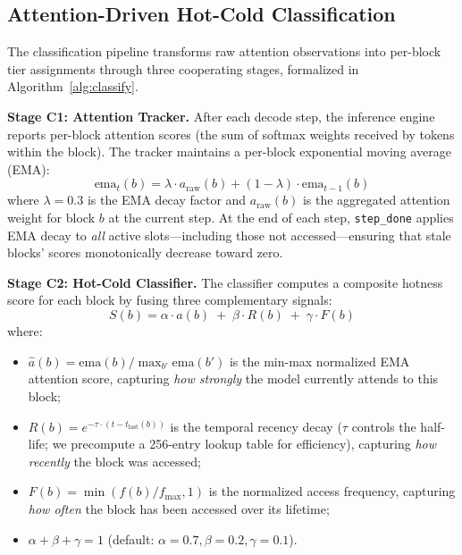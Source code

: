 \documentclass[conference]{IEEEtran}
\begin{document}

\subsection{Attention-Driven Hot-Cold Classification}
\label{sec:classification}

The classification pipeline transforms raw attention observations into per-block tier assignments through three cooperating stages, formalized in Algorithm~\ref{alg:classify}.

\textbf{Stage C1: Attention Tracker.} After each decode step, the inference engine reports per-block attention scores (the sum of softmax weights received by tokens within the block). The tracker maintains a per-block exponential moving average (EMA):
\begin{equation}
\text{ema}_{t}(b) = \lambda \cdot a_{\text{raw}}(b) + (1 - \lambda) \cdot \text{ema}_{t-1}(b)
\end{equation}
where $\lambda = 0.3$ is the EMA decay factor and $a_{\text{raw}}(b)$ is the aggregated attention weight for block $b$ at the current step. At the end of each step, \texttt{step\_done} applies EMA decay to \emph{all} active slots---including those not accessed---ensuring that stale blocks' scores monotonically decrease toward zero.

\textbf{Stage C2: Hot-Cold Classifier.} The classifier computes a composite hotness score for each block by fusing three complementary signals:
\begin{equation}
S(b) = \alpha \cdot \hat{a}(b) \;+\; \beta \cdot R(b) \;+\; \gamma \cdot F(b)
\label{eq:hotness}
\end{equation}
where:
\begin{itemize}
\item $\hat{a}(b) = \text{ema}(b) / \max_{b'} \text{ema}(b')$ is the min-max normalized EMA attention score, capturing \emph{how strongly} the model currently attends to this block;
\item $R(b) = e^{-\tau \cdot (t - t_{\text{last}}(b))}$ is the temporal recency decay ($\tau$ controls the half-life; we precompute a 256-entry lookup table for efficiency), capturing \emph{how recently} the block was accessed;
\item $F(b) = \min(f(b) / f_{\max}, 1)$ is the normalized access frequency, capturing \emph{how often} the block has been accessed over its lifetime;
\item $\alpha + \beta + \gamma = 1$ (default: $\alpha{=}0.7, \beta{=}0.2, \gamma{=}0.1$).
\end{itemize}
\end{document}

